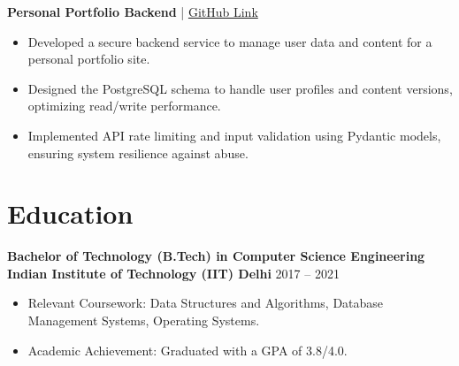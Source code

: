 \documentclass[10pt, letterpaper]{article}
\begin{document}
\textbf{Personal Portfolio Backend} | \href{https://github.com/punyamittal/portfolio-backend}{GitHub Link}
\begin{itemize}
    \item Developed a secure backend service to manage user data and content for a personal portfolio site.
    \item Designed the PostgreSQL schema to handle user profiles and content versions, optimizing read/write performance.
    \item Implemented API rate limiting and input validation using Pydantic models, ensuring system resilience against abuse.
\end{itemize}

\section*{Education}
\textbf{Bachelor of Technology (B.Tech) in Computer Science Engineering}
\hfill \textbf{Indian Institute of Technology (IIT) Delhi} \hfill 2017 – 2021
\begin{itemize}
    \item Relevant Coursework: Data Structures and Algorithms, Database Management Systems, Operating Systems.
    \item Academic Achievement: Graduated with a GPA of 3.8/4.0.
\end{itemize}
\end{document}
